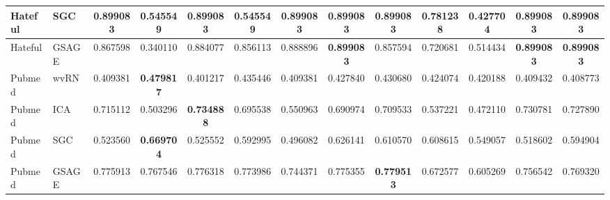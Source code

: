 \begin{table*}
{\begin{tabular}{|l|l|c|c|c|c|c|c|c|c|c|c|c|}
  Hateful &        SGC &  \textbf{0.899083} &  0.545549 &  \textbf{0.899083} &  0.545549 &  \textbf{0.899083} &  \textbf{0.899083} &  \textbf{0.899083} &  0.781238 &  0.427704 &  \textbf{0.899083} &  \textbf{0.899083}\\ \hline
  Hateful &      GSAGE &  0.867598 &  0.340110 &  0.884077 &  0.856113 &  0.888896 &  \textbf{0.899083} &  0.857594 &  0.720681 &  0.514434 &  \textbf{0.899083} &  \textbf{0.899083}\\ \hline
  Pubmed &       wvRN &  0.409381 &  \textbf{0.479817} &  0.401217 &  0.435446 &  0.409381 &  0.427840 &  0.430680 &  0.424074 &  0.420188 &  0.409432 &  0.408773\\ \hline
  Pubmed &        ICA &  0.715112 &  0.503296 &  \textbf{0.734888} &  0.695538 &  0.550963 &  0.690974 &  0.709533 &  0.537221 &  0.472110 &  0.730781 &  0.727890\\ \hline
  Pubmed &        SGC &  0.523560 &  \textbf{0.669704} &  0.525552 &  0.592995 &  0.496082 &  0.626141 &  0.610570 &  0.608615 &  0.549057 &  0.518602 &  0.594904\\ \hline
  Pubmed &      GSAGE &  0.775913 &  0.767546 &  0.776318 &  0.773986 &  0.744371 &  0.775355 &  \textbf{0.779513} &  0.672577 &  0.605269 &  0.756542 &  0.769320\\ \hline
\end{tabular}
}
\label{table:f1}
\end{table*}